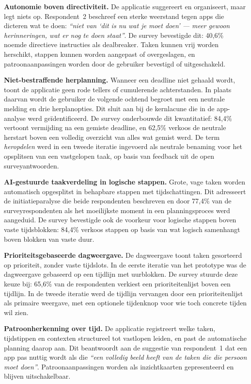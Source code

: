 \textbf{Autonomie boven directiviteit.}
De applicatie suggereert en organiseert, maar legt niets op. Respondent~2
beschreef een sterke weerstand tegen apps die dicteren wat te doen:
\textit{``niet van `dit is nu wat je moet doen' — meer gewoon herinneringen, wat
er nog te doen staat''}. De survey bevestigde dit: 40,6\% noemde directieve
instructies als dealbreaker. Taken kunnen vrij worden herschikt, stappen kunnen
worden aangepast of overgeslagen, en patroonaanpassingen worden door de gebruiker
bevestigd of uitgeschakeld.

\textbf{Niet-bestraffende herplanning.}
Wanneer een deadline niet gehaald wordt, toont de applicatie geen rode tellers of
cumulerende achterstanden. In plaats daarvan wordt de gebruiker de volgende
ochtend begroet met een neutrale melding en drie herplanopties. Dit sluit aan bij
de kernlacune die in de app-analyse werd geïdentificeerd. De survey onderbouwde
dit kwantitatief: 84,4\% vertoont vermijding na een gemiste deadline, en 62,5\%
verkoos de neutrale herstart boven een volledig overzicht van alles wat gemist
werd. De term \textit{heropdelen} werd in een tweede iteratie ingevoerd als
neutrale benaming voor het opsplitsen van een vastgelopen taak, op basis van
feedback uit de open surveyantwoorden.

\textbf{AI-gestuurde taakverdeling in logische stappen.}
Grote, vage taken worden automatisch opgesplitst in behapbare stappen met
tijdschattingen. Dit adresseert de initiatieparalyse die beide respondenten
beschreven en door 77,4\% van de surveyrespondenten als het moeilijkste moment
in een planningsproces werd aangeduid. De survey bevestigde ook de voorkeur voor
logische stappen boven vaste tijdsblokken: 84,4\% verkoos stappen op basis van
wat logisch samenhangt boven blokken van vaste duur.

\textbf{Prioriteitsgebaseerde dagweergave.}
De dagweergave toont taken gesorteerd op prioriteit, zonder vaste tijdslots. In
de eerste iteratie van het prototype was de dagweergave gebaseerd op een tijdlijn
met uurblokken. De survey stuurde deze keuze bij: 65,6\% van de respondenten
verkiest een prioriteitenlijst boven een tijdlijn. In de tweede iteratie werd de
tijdlijn vervangen door een prioriteitenlijst als primaire weergave, met een
optionele tijdenknop voor wie toch concrete tijden wil zien.

\textbf{Patroonherkenning over tijd.}
De applicatie registreert welke taken, tijdstippen en contexten structureel tot
vastlopen leiden, en past de automatische planning daarop aan. Dit beantwoordt aan
de suggestie van respondent~1 dat een app pas nuttig wordt als die \textit{``een
volledig beeld heeft van de taken die die persoon moet doen''}. Patroonaanpassingen
worden als inzichtkaarten gepresenteerd en blijven uitschakelbaar.

